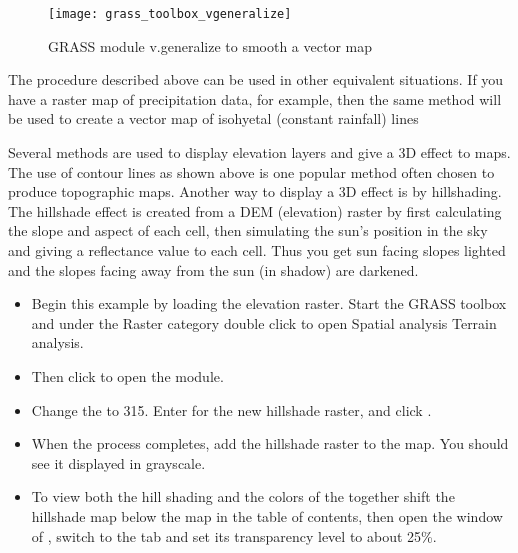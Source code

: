 \begin{figure}[h]
 \centering
 \texttt{[image: grass\_toolbox\_vgeneralize]}
 \caption{GRASS module v.generalize to smooth a vector map \nixcaption}\label{fig:grass_toolbox_vgeneralize}
\end{figure}

\begin{Tip}\caption{\textsc{Other uses for r.contour}}
The procedure described above can be used in other equivalent
situations. If you have a raster map of precipitation data, for example, then
the same method will be used to create a vector map of isohyetal (constant
rainfall) lines
\end{Tip}


Several methods are used to display elevation layers and give a 3D effect to
maps. The use of contour lines as shown above is one popular method often
chosen to produce topographic maps. Another way to display a 3D effect is by
hillshading. The hillshade effect is created from a DEM (elevation) raster by
first calculating the slope and aspect of each cell, then simulating the
sun's position in the sky and giving a reflectance value to each cell. Thus
you get sun facing slopes lighted and the slopes facing away from the sun (in
shadow) are darkened.

\begin{itemize}[label=--]
\item Begin this example by loading the  elevation raster.
Start the GRASS toolbox and under the Raster category double click to open Spatial
analysis \arrow Terrain analysis.
\item Then click  to open
the module.
\item Change the  to 315. Enter
 for the new hillshade raster, and click
.
\item When the process completes, add the hillshade raster to the map. You
should see it displayed in grayscale.
\item To view both the hill shading and the colors of the
 together shift the hillshade map below the
 map in the table of contents, then open the
 window of , switch to the
 tab and set its transparency level to about 25\%.
\end{itemize}

